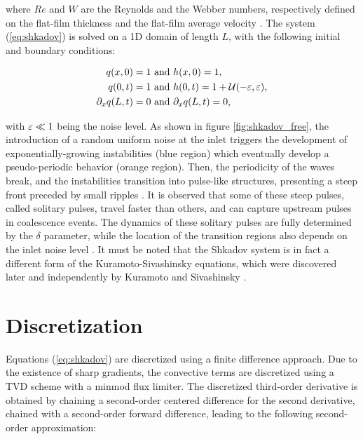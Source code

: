 \noindent where $Re$ and $W$ are the Reynolds and the Webber numbers, respectively defined on the flat-film thickness and the flat-film average velocity \cite{chang2002}. The system (\ref{eq:shkadov}) is solved on a 1D domain of length $L$, with the following initial and boundary conditions:

\begin{equation}
\label{eq:shkadov_bc}
\begin{split}
	q(x,0)		= 1 &\text{ and } h(x,0)	= 1, \\
	q(0,t) 		= 1 &\text{ and } h(0,t) 	= 1 + \mathcal{U} ( -\varepsilon, \varepsilon), \\
	\partial_x q(L,t) = 0 &\text{ and } 	\partial_x q(L,t) = 0,
\end{split}
\end{equation}

with $\varepsilon \ll 1$ being the noise level. As shown in figure \ref{fig:shkadov_free}, the introduction of a random uniform noise at the inlet triggers the development of exponentially-growing instabilities (blue region) which eventually develop a pseudo-periodic behavior (orange region). Then, the periodicity of the waves break, and the instabilities transition into pulse-like structures, presenting a steep front preceded by small ripples \cite{chang2002book}. It is observed that some of these steep pulses, called solitary pulses, travel faster than others, and can capture upstream pulses in coalescence events. The dynamics of these solitary pulses are fully determined by the $\delta$ parameter, while the location of the transition regions also depends on the inlet noise level \cite{chang2002}. It must be noted that the Shkadov system is in fact a different form of the Kuramoto-Sivashinsky equations, which were discovered later and independently by Kuramoto and Sivashinsky \cite{koulago1995}.



\section{Discretization}

Equations (\ref{eq:shkadov}) are discretized using a finite difference approach. Due to the existence of sharp gradients, the convective terms are discretized using a TVD scheme with a minmod flux limiter. The discretized third-order derivative is obtained by chaining a second-order centered difference for the second derivative, chained with a second-order forward difference, leading to the following second-order approximation:

